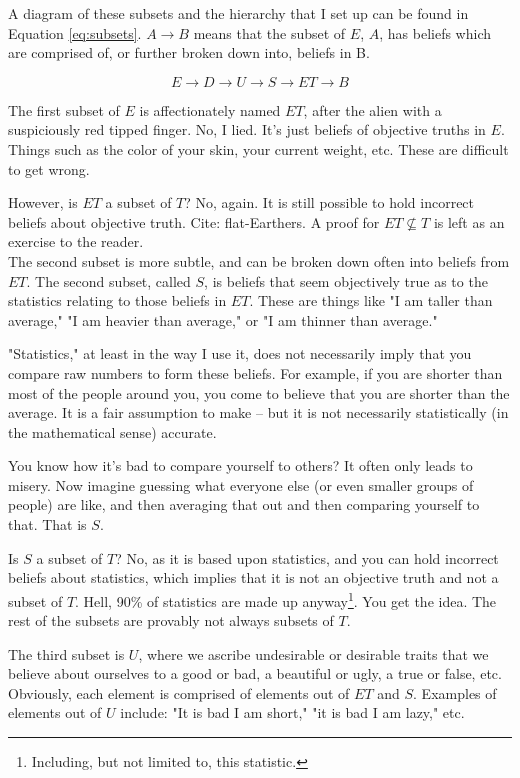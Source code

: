 \documentclass{article}
\begin{document}
A diagram of these subsets and the hierarchy that I set up can be found in
Equation \ref{eq:subsets}. $A \to B$ means that the subset of $E$, $A$, has
beliefs which are comprised of, or further broken down into, beliefs in B.

\begin{equation}
E \to D \to U \to S \to ET \to B
\label{eq:subsets}
\end{equation}

The first subset of $E$ is affectionately named $ET$, after the alien with a
suspiciously red tipped finger. No, I lied. It's just beliefs of objective
truths in $E$. Things such as the color of your skin, your current weight, etc.
These are difficult to get wrong. 

However, is $ET$ a subset of $T$? No, again. It is still possible to hold
incorrect beliefs about objective truth. Cite: flat-Earthers. A proof for $ET
\not \subseteq T$ is left as an exercise to the reader. \\

\noindent The second subset is more subtle, and can be broken down often into
beliefs from $ET$. The second subset, called $S$, is beliefs that seem
objectively true as to the statistics relating to those beliefs in $ET$. These
are things like "I am taller than average," "I am heavier than average," or "I
am thinner than average."

"Statistics," at least in the way I use it, does not necessarily imply that you
compare raw numbers to form these beliefs. For example, if you are shorter than
most of the people around you, you come to believe that you are shorter than the
average. It is a fair assumption to make -- but it is not necessarily
statistically (in the mathematical sense) accurate.

You know how it's bad to compare yourself to others? It often only leads to
misery. Now imagine guessing what everyone else (or even smaller groups of
people) are like, and then averaging that out and then comparing yourself to
that. That is $S$.

Is $S$ a subset of $T$? No, as it is based upon statistics, and you can hold
incorrect beliefs about statistics, which implies that it is not an objective
truth and not a subset of $T$. Hell, 90\% of statistics are made up
anyway\footnote{Including, but not limited to, this statistic.}. You get the
idea. The rest of the subsets are provably not always subsets of $T$.

The third subset is $U$, where we ascribe undesirable or desirable traits that
we believe about ourselves to a good or bad, a beautiful or ugly, a true or
false, etc. Obviously, each element is comprised of elements out of $ET$ and
$S$. Examples of elements out of $U$ include: "It is bad I am short," "it is bad
I am lazy," etc.
\end{document}
